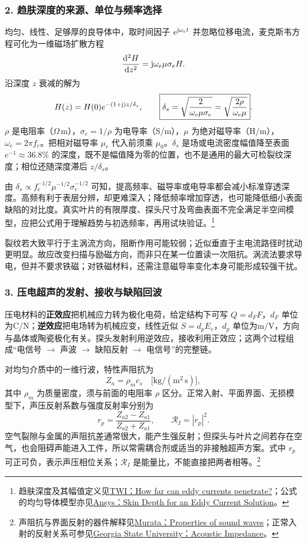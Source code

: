 \subsubsection*{2. 趋肤深度的来源、单位与频率选择}
均匀、线性、足够厚的良导体中，取时间因子 $e^{\mathrm{j}\omega_et}$ 并忽略位移电流，麦克斯韦方程可化为一维磁场扩散方程
\[
\frac{\mathrm{d}^2 H}{\mathrm{d} z^2}=\mathrm{j}\omega_e\mu\sigma_e H.
\]
沿深度 $z$ 衰减的解为
\[
H(z)=H(0)e^{-(1+\mathrm{j})z/\delta_s},\qquad
\boxed{\delta_s=\sqrt{\frac{2}{\omega_e\mu\sigma_e}}
=\sqrt{\frac{2\rho}{\omega_e\mu}}}.
\]
$\rho$ 是电阻率（$\Omega\,\mathrm m$），$\sigma_e=1/\rho$ 为电导率（S/m），$\mu$ 为绝对磁导率（H/m），$\omega_e=2\pi f_e$。把相对磁导率 $\mu_r$ 代入前须乘 $\mu_0$。$\delta_s$ 是场或电流密度幅值降至表面 $e^{-1}\approx36.8\%$ 的深度，既不是幅值降为零的位置，也不是通用的最大可检裂纹深度；相位还随深度滞后 $z/\delta_s$。

由 $\delta_s\propto f_e^{-1/2}\mu^{-1/2}\sigma_e^{-1/2}$ 可知，提高频率、磁导率或电导率都会减小标准穿透深度。高频有利于表层分辨，却更难深入；降低频率增加穿透，也可能降低细小表面缺陷的对比度。真实叶片的有限厚度、探头尺寸及弯曲表面不完全满足半空间模型，应把公式用于理解趋势与初选频率，再用试块验证。\footnote{趋肤深度及其幅值定义见\href{https://www.twi-global.com/technical-knowledge/faqs/faq-how-far-can-eddy-currents-penetrate}{TWI：How far can eddy currents penetrate?}；公式的均匀导体模型亦见\href{https://ansyshelp.ansys.com/public/views/secured/electronics/v242/en/subsystems/maxwell/content/SkinDepthforanEddyCurrentSolution.htm}{Ansys：Skin Depth for an Eddy Current Solution}。}

裂纹若大致平行于主涡流方向，阻断作用可能较弱；近似垂直于主电流路径时扰动更明显。故应改变扫描与励磁方向，而非只在某一位置读一次阻抗。涡流法要求导电，但并不要求铁磁；对铁磁材料，还需注意磁导率变化本身可能形成较强干扰。

\subsubsection*{3. 压电超声的发射、接收与缺陷回波}
压电材料的\textbf{正效应}把机械应力转为极化电荷，给定结构下可写 $Q=d_FF$，$d_F$ 单位为C/N；\textbf{逆效应}把电场转为机械应变，线性近似 $S=d_pE_e$，$d_p$ 单位为m/V，方向与晶体或陶瓷极化有关。探头发射利用逆效应，接收利用正效应；这两个过程组成“电信号 $\to$ 声波 $\to$ 缺陷反射 $\to$ 电信号”的完整链。

对均匀介质中的一维行波，特性声阻抗为
\[
Z_a=\rho_m c_s\quad
\bigl[\mathrm{kg/(m^2\,s)}\bigr],
\]
其中 $\rho_m$ 为质量密度，须与前面的电阻率 $\rho$ 区分。正常入射、平面界面、无损模型下，声压反射系数与强度反射率分别为
\[
r_p=\frac{Z_{a2}-Z_{a1}}{Z_{a2}+Z_{a1}},\qquad
\mathcal R_I=|r_p|^2.
\]
空气裂隙与金属的声阻抗差通常很大，能产生强反射；但探头与叶片之间若存在空气，也会阻碍声能进入工件，所以常需耦合剂或适当的非接触超声方案。式中 $r_p$ 可正可负，表示声压相位关系；$\mathcal R_I$ 是能量比，不能直接把两者相等。\footnote{声阻抗与界面反射的器件解释见\href{https://www.murata.com/products/sensor/ultrasonic/overview/basic/nature}{Murata：Properties of sound waves}；正常入射的反射关系可参见\href{https://hyperphysics.phy-astr.gsu.edu/hbase/Sound/acousimp.html}{Georgia State University：Acoustic Impedance}。}

